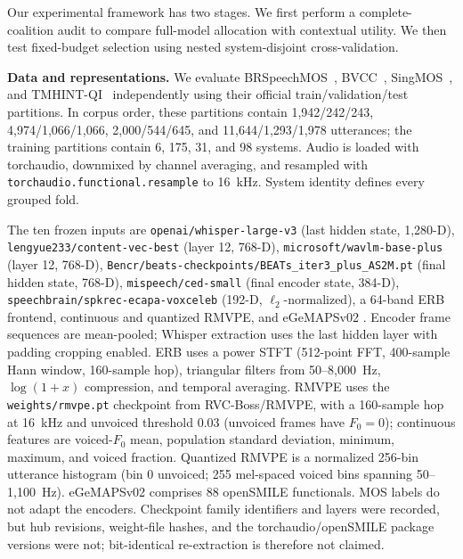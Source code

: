 \documentclass{article}
\begin{document}
Our experimental framework has two stages. We first perform a complete-coalition
audit to compare full-model allocation with contextual utility. We then test
fixed-budget selection using nested system-disjoint cross-validation.

\noindent\textbf{Data and representations.}
We evaluate BRSpeechMOS~\cite{oliveira2023representations}, BVCC~\cite{huang2022voicemos}, SingMOS~\cite{tang2024singmos}, and TMHINT-QI~\cite{chen2022inqss} independently using their official train/validation/test partitions. In corpus order, these partitions contain 1{,}942/242/243, 4{,}974/1{,}066/1{,}066, 2{,}000/544/645, and 11{,}644/1{,}293/1{,}978 utterances; the training partitions contain 6, 175, 31, and 98 systems. Audio is loaded with torchaudio, downmixed by channel averaging, and resampled with \nolinkurl{torchaudio.functional.resample} to 16~kHz. System identity defines every grouped fold.

The ten frozen inputs are \nolinkurl{openai/whisper-large-v3} (last hidden state, 1,280-D),
\nolinkurl{lengyue233/content-vec-best} (layer 12, 768-D),
\nolinkurl{microsoft/wavlm-base-plus} (layer 12, 768-D),
\nolinkurl{Bencr/beats-checkpoints/BEATs_iter3_plus_AS2M.pt} (final hidden state, 768-D),
\nolinkurl{mispeech/ced-small} (final encoder state, 384-D),
\nolinkurl{speechbrain/spkrec-ecapa-voxceleb} (192-D, $\ell_2$-normalized),
a 64-band ERB frontend, continuous and quantized RMVPE, and eGeMAPSv02
\cite{radford2023whisper,qian2022contentvec,chen2022wavlm,chen2023beats,desplanques2020ecapa,wei2023rmvpe,dinkel2024ced,eyben2016egemaps}.
Encoder frame sequences are mean-pooled; Whisper extraction uses the last
hidden layer with padding cropping enabled. ERB uses a power STFT (512-point
FFT, 400-sample Hann window, 160-sample hop), triangular filters from
50--8{,}000~Hz, $\log(1+x)$ compression, and temporal averaging. RMVPE uses
the \nolinkurl{weights/rmvpe.pt} checkpoint from RVC-Boss/RMVPE, with a
160-sample hop at 16~kHz and unvoiced threshold 0.03 (unvoiced frames have
$F_0=0$); continuous features are
voiced-$F_0$ mean, population standard deviation, minimum, maximum, and voiced
fraction. Quantized RMVPE is a normalized 256-bin utterance histogram (bin 0
unvoiced; 255 mel-spaced voiced bins spanning 50--1{,}100~Hz). eGeMAPSv02
comprises 88 openSMILE functionals. MOS labels do not adapt the encoders.
Checkpoint family identifiers and layers were recorded, but hub revisions,
weight-file hashes, and the torchaudio/openSMILE package versions were not;
bit-identical re-extraction is therefore not claimed.
\end{document}
